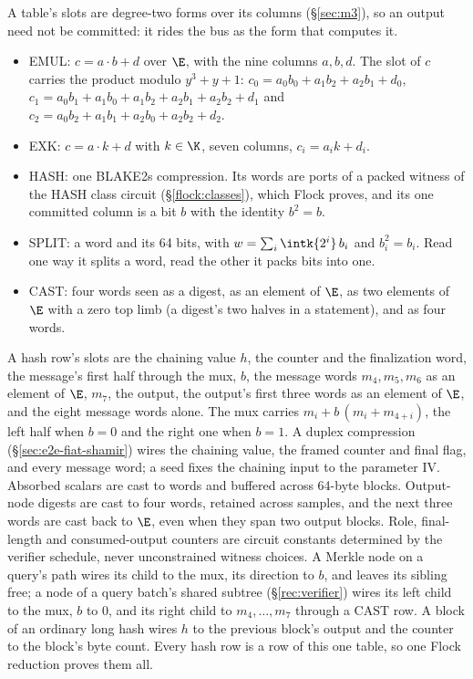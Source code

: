 A table's slots are degree-two forms over its columns (\S\ref{sec:m3}), so an output need not be committed: it rides the bus as the form that computes it.
\begin{itemize}[itemsep=1pt,topsep=3pt]
\item \textsf{EMUL}: $c=a\cdot b+d$ over $\E$, with the nine columns $a,b,d$. The slot of $c$ carries the product modulo $y^3+y+1$: $c_0=a_0b_0+a_1b_2+a_2b_1+d_0$, $c_1=a_0b_1+a_1b_0+a_1b_2+a_2b_1+a_2b_2+d_1$ and $c_2=a_0b_2+a_1b_1+a_2b_0+a_2b_2+d_2$.
\item \textsf{EXK}: $c=a\cdot k+d$ with $k\in\K$, seven columns, $c_i=a_ik+d_i$.
\item \textsf{HASH}: one BLAKE2s compression. Its words are ports of a packed witness of the \textsf{HASH} class circuit (\S\ref{flock:classes}), which Flock proves, and its one committed column is a bit $b$ with the identity $b^2=b$.
\item \textsf{SPLIT}: a word and its 64 bits, with $w=\sum_i\intk{2^i}\,b_i$ and $b_i^2=b_i$. Read one way it splits a word, read the other it packs bits into one.
\item \textsf{CAST}: four words seen as a digest, as an element of $\E$, as two elements of $\E$ with a zero top limb (a digest's two halves in a statement), and as four words.
\end{itemize}
A hash row's slots are the chaining value $h$, the counter and the finalization word, the message's first half through the mux, $b$, the message words $m_4,m_5,m_6$ as an element of $\E$, $m_7$, the output, the output's first three words as an element of $\E$, and the eight message words alone. The mux carries $m_i+b\,(m_i+m_{4+i})$, the left half when $b=0$ and the right one when $b=1$. A duplex compression (\S\ref{sec:e2e-fiat-shamir}) wires the chaining value, the framed counter and final flag, and every message word; a seed fixes the chaining input to the parameter IV. Absorbed scalars are cast to words and buffered across 64-byte blocks. Output-node digests are cast to four words, retained across samples, and the next three words are cast back to $\E$, even when they span two output blocks. Role, final-length and consumed-output counters are circuit constants determined by the verifier schedule, never unconstrained witness choices. A Merkle node on a query's path wires its child to the mux, its direction to $b$, and leaves its sibling free; a node of a query batch's shared subtree (\S\ref{rec:verifier}) wires its left child to the mux, $b$ to $0$, and its right child to $m_4,\dots,m_7$ through a \textsf{CAST} row. A block of an ordinary long hash wires $h$ to the previous block's output and the counter to the block's byte count. Every hash row is a row of this one table, so one Flock reduction proves them all.


